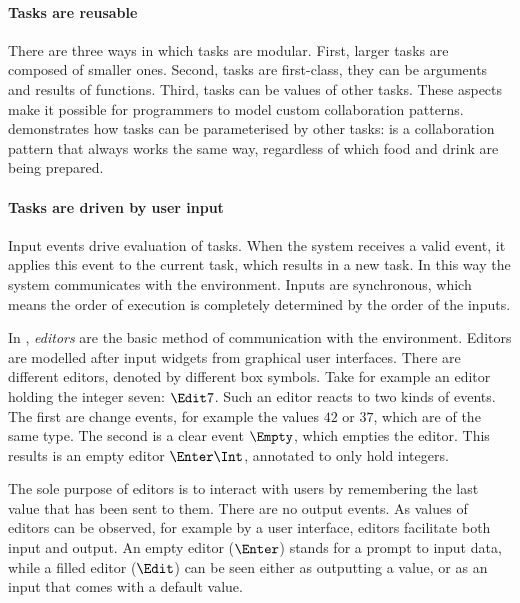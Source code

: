 \paragraph{Tasks are reusable}

There are three ways in which tasks are modular.
First, larger tasks are composed of smaller ones.
Second, tasks are first-class, they can be arguments and results of functions.
Third, tasks can be values of other tasks.
These aspects make it possible for programmers to model custom collaboration patterns.
%
 demonstrates how tasks can be parameterised by other tasks:  is a collaboration pattern that always works the same way, regardless of which food and drink are being prepared.



\paragraph{Tasks are driven by user input}

Input events drive evaluation of tasks.
When the system receives a valid event, it applies this event to the current task, which results in a new task.
In this way the system communicates with the environment.
Inputs are synchronous, which means the order of execution is completely determined by the order of the inputs.

In \TOPHAT, \emph{editors} are the basic method of communication with the environment.
Editors are modelled after input widgets from graphical user interfaces.
There are different editors, denoted by different box symbols.
Take for example an editor holding the integer seven: $\Edit 7$.
Such an editor reacts to two kinds of events.
The first are change events, for example the values $42$ or $37$, which are of the same type.
The second is a clear event $\Empty$, which empties the editor.
This results is an empty editor $\Enter \Int$, annotated to only hold integers.


The sole purpose of editors is to interact with users by remembering the last value that has been sent to them.
There are no output events.
As values of editors can be observed, for example by a user interface, editors facilitate both input and output.
An empty editor ($\Enter$) stands for a prompt to input data,
while a filled editor ($\Edit$) can be seen either as outputting a value, or as an input that comes with a default value.



